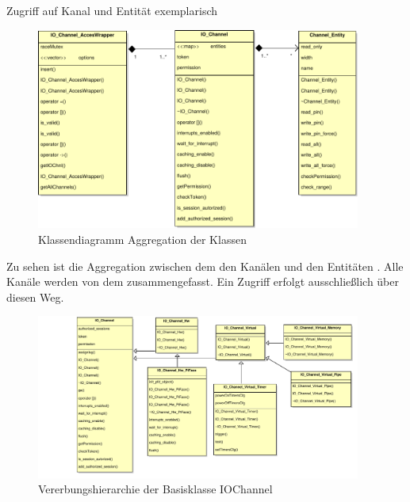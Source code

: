 \begin{listing}[H]
	\inputminted[numbersep=1pt,fontsize=\scriptsize,frame=single, firstline=415,lastline=416]{c}{./code/main-klassenstruktur.cpp}
	\caption{Zugriff auf Kanal und Entität exemplarisch}
	\label{code:chnlAccess}
\end{listing}


\begin{figure}[H]
	\begin{center}
		\includegraphics[width=0.95\textwidth ,clip]{./code/Aggregation.pdf}
		\caption{Klassendiagramm Aggregation der Klassen}
		\label{img:classAgregation}
	\end{center} 
\end{figure}	
Zu sehen ist die Aggregation zwischen dem  den Kanälen  und den Entitäten . Alle Kanäle werden von dem   zusammengefasst. Ein Zugriff erfolgt ausschließlich über diesen Weg. 


\begin{figure}[H]
	\begin{center}
		\includegraphics[width=0.95\textwidth ,clip]{./code/IOChannel.pdf}
		\caption{Vererbungshierarchie der Basisklasse IOChannel}
		\label{img:classIOChannel}
	\end{center} 
\end{figure}	

